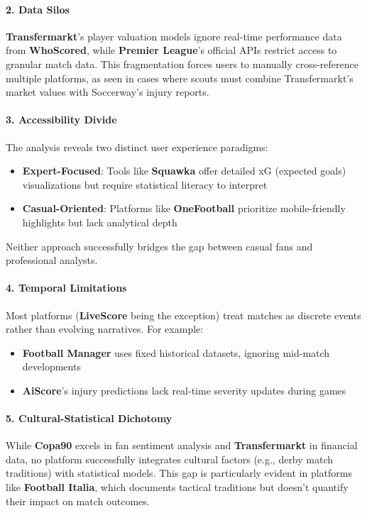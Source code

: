 \paragraph{2. Data Silos}
\textbf{Transfermarkt}'s player valuation models ignore real-time performance data from \textbf{WhoScored}, while \textbf{Premier League}'s official APIs restrict access to granular match data. This fragmentation forces users to manually cross-reference multiple platforms, as seen in cases where scouts must combine Transfermarkt's market values with Soccerway's injury reports.

\paragraph{3. Accessibility Divide}
The analysis reveals two distinct user experience paradigms:
\begin{itemize}
    \item \textbf{Expert-Focused}: Tools like \textbf{Squawka} offer detailed xG (expected goals) visualizations but require statistical literacy to interpret
    \item \textbf{Casual-Oriented}: Platforms like \textbf{OneFootball} prioritize mobile-friendly highlights but lack analytical depth
\end{itemize}
Neither approach successfully bridges the gap between casual fans and professional analysts.

\paragraph{4. Temporal Limitations}
Most platforms (\textbf{LiveScore} being the exception) treat matches as discrete events rather than evolving narratives. For example:
\begin{itemize}
    \item \textbf{Football Manager} uses fixed historical datasets, ignoring mid-match developments
    \item \textbf{AiScore}'s injury predictions lack real-time severity updates during games
\end{itemize}

\paragraph{5. Cultural-Statistical Dichotomy}
While \textbf{Copa90} excels in fan sentiment analysis and \textbf{Transfermarkt} in financial data, no platform successfully integrates cultural factors (e.g., derby match traditions) with statistical models. This gap is particularly evident in platforms like \textbf{Football Italia}, which documents tactical traditions but doesn't quantify their impact on match outcomes.


